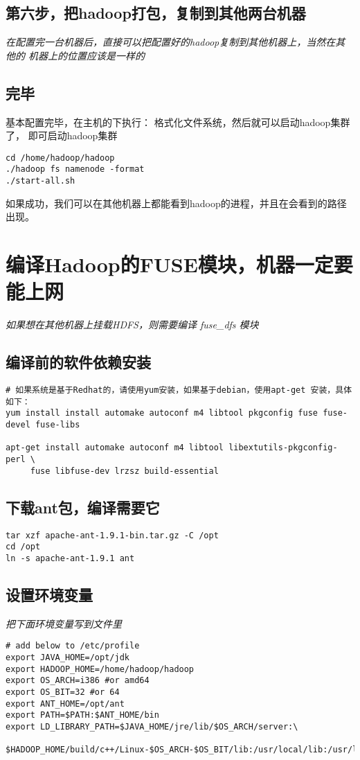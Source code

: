 \documentclass{article}
\begin{document}
\subsection{第六步，把hadoop打包，复制到其他两台机器}
\textit{在配置完一台机器后，直接可以把配置好的hadoop复制到其他机器上，当然在其他的
机器上的位置应该是一样的}

\subsection{完毕}
基本配置完毕，在主机的下执行：
 格式化文件系统，然后就可以启动hadoop集群了，
即可启动hadoop集群

\begin{verbatim}
cd /home/hadoop/hadoop
./hadoop fs namenode -format
./start-all.sh
\end{verbatim}

如果成功，我们可以在其他机器上都能看到hadoop的进程，并且在会看到的路径
出现。

\section{编译Hadoop的FUSE模块，机器一定要能上网}
\textit{如果想在其他机器上挂载HDFS，则需要编译 fuse\_dfs 模块}
\subsection{编译前的软件依赖安装}
\begin{verbatim}
# 如果系统是基于Redhat的，请使用yum安装，如果基于debian，使用apt-get 安装，具体如下：
yum install install automake autoconf m4 libtool pkgconfig fuse fuse-devel fuse-libs

apt-get install automake autoconf m4 libtool libextutils-pkgconfig-perl \
	 fuse libfuse-dev lrzsz build-essential
\end{verbatim}

\subsection{下载ant包，编译需要它}
\begin{verbatim}
tar xzf apache-ant-1.9.1-bin.tar.gz -C /opt
cd /opt
ln -s apache-ant-1.9.1 ant

\end{verbatim}

\subsection{设置环境变量}
\textit{把下面环境变量写到文件里}
\begin{verbatim}
# add below to /etc/profile
export JAVA_HOME=/opt/jdk
export HADOOP_HOME=/home/hadoop/hadoop
export OS_ARCH=i386 #or amd64
export OS_BIT=32 #or 64
export ANT_HOME=/opt/ant
export PATH=$PATH:$ANT_HOME/bin
export LD_LIBRARY_PATH=$JAVA_HOME/jre/lib/$OS_ARCH/server:\ 
	$HADOOP_HOME/build/c++/Linux-$OS_ARCH-$OS_BIT/lib:/usr/local/lib:/usr/lib
\end{verbatim}
\end{document}
